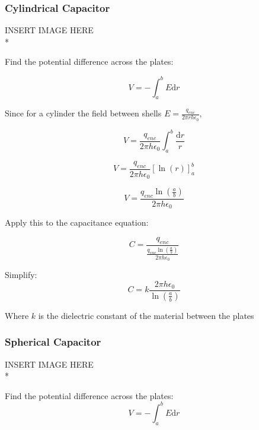 \documentclass[a4paper,12pt]{article}
\begin{document}
			\subsubsection{Cylindrical Capacitor}
				INSERT IMAGE HERE\\*

				Find the potential difference across the plates:

				\begin{equation*}
						V = - \int_{a}^{b} E\mathrm{d}r
				\end{equation*}

				Since for a cylinder the field between shells $E = \frac{q_{enc}}{2\pi rh \epsilon_{0}}$,

				\begin{equation*}
						V = \frac{q_{enc}}{2\pi h \epsilon_{0}}\int_{a}^{b} \frac{\mathrm{d}r}{r} 
				\end{equation*}


				\begin{equation*}
						V = \frac{q_{enc}}{2\pi h \epsilon_{0}}  \left[ \ln(r) \right]_{a}^{b}
				\end{equation*}

				\begin{equation*}
						V = \frac{q_{enc} \ln(\frac{a}{b})}{2\pi h\epsilon_{0}}
				\end{equation*}

				Apply this to the capacitance equation:

				\begin{equation*}
						C = \frac{q_{enc}}{\frac{q_{enc} \ln(\frac{a}{b})}{2\pi h\epsilon_{0}} }
				\end{equation*}

				Simplify:
				\begin{equation*}
						C = k \frac{2\pi h \epsilon_{0}}{\ln(\frac{a}{b})}
				\end{equation*}

				Where $k$ is the dielectric constant of the material between the plates
			\subsubsection{Spherical Capacitor}
				INSERT IMAGE HERE\\*
				
				Find the potential difference across the plates:
				\begin{equation*}
						V = -\int_{a}^{b} E\mathrm{d}r
				\end{equation*}
\end{document}
